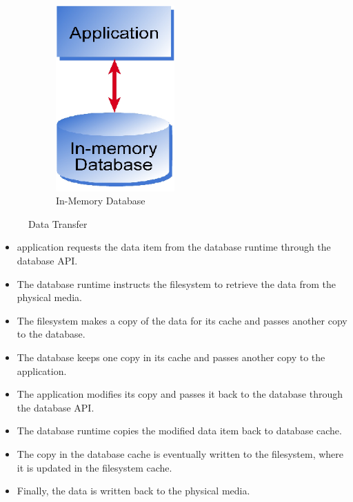 \documentclass[10pt]{article} %
\begin{document}
\begin{figure}
\begin{subfigure}[b]{0.3\textwidth}
		\includegraphics[width=0.5\textwidth]{./pictures/fig4}
		\caption{In-Memory Database}
		\label{fig:fig3b}
	\end{subfigure}
	\caption{Data Transfer}\label{fig:fig3}
\end{figure}

\begin{itemize}
\item application requests the data item from the database runtime through the database API.

\item The database runtime instructs the filesystem to retrieve the data from the physical media.

\item The filesystem makes a copy of the data for its cache and passes another copy to the database.

\item The database keeps one copy in its cache and passes another copy to the application.

\item The application modifies its copy and passes it back to the database through the database API.

\item The database runtime copies the modified data item back to database cache.

\item The copy in the database cache is eventually written to the filesystem, where it is updated in the filesystem cache.

\item Finally, the data is written back to the physical media.
\end{itemize}
\end{document}
